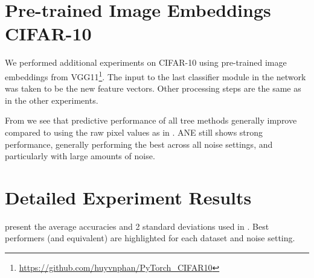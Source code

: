 \documentclass[letterpaper]{article} %
\begin{document}
\section{Pre-trained Image Embeddings CIFAR-10}
\label{app:cifar10-pretrained}


We performed additional experiments on CIFAR-10 using pre-trained image embeddings from VGG11\footnote{\url{https://github.com/huyvnphan/PyTorch_CIFAR10}}.
The input to the last classifier module in the network was taken to be the new feature vectors.
Other processing steps are the same as in the other experiments.


From
we see that predictive performance of all tree methods generally improve compared to using the raw pixel values as in .
ANE still shows strong performance,
generally performing the best across all noise settings,
and particularly with large amounts of noise.







\section{Detailed Experiment Results}
\label{app:results}

 present the average accuracies and 2 standard deviations
used in .
Best performers (and equivalent) are highlighted for each dataset and noise setting.

\end{document}
